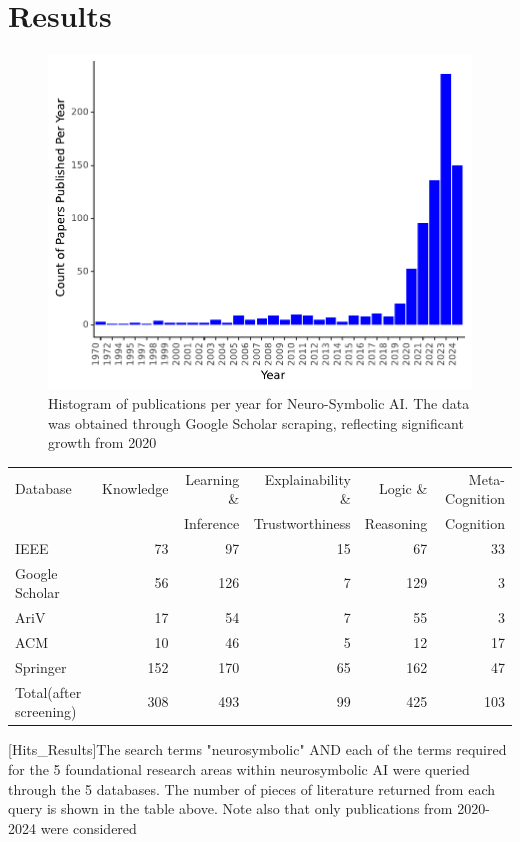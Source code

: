 \documentclass[hf]{ceurart}
\begin{document}
\section{Results}\label{sec:results}
\begin{figure}[ht]
    \centering
   \includegraphics[width=\textwidth]{Figures/publications_by_year_v2.pdf}
    \caption{Histogram of publications per year for Neuro-Symbolic AI. The data was obtained through Google Scholar scraping, reflecting significant growth from 2020}
    \label{fig:pubs_by_year}
\end{figure}


\begin{table}[ht]
    \centering
    \begin{tabular}{lrrrrr}
        Database & Knowledge & Learning \& & Explainability \& & Logic \& & Meta-Cognition \\
         &  & Inference & Trustworthiness & Reasoning & Cognition \\
        \hline
        IEEE & 73 & 97 & 15 & 67 & 33  \\
        Google Scholar & 56 & 126 & 7 & 129 & 3  \\
        Ar\textnormal{\raisebox{0.5ex}{$\chi$}}iV & 17 & 54 & 7 & 55 & 3  \\
        ACM & 10 & 46 & 5 & 12 & 17  \\
        Springer & 152 & 170 & 65 & 162 & 47  \\
        Total(after screening)   & 308 & 493 & 99 & 425 & 103  \\
     \end{tabular}
     [Hits_Results]{The search terms "neurosymbolic" AND each of the terms required for the 5 foundational research areas within neurosymbolic AI were queried through the 5 databases. The number of pieces of literature returned from each query is shown in the table above. Note also that only publications from 2020-2024 were considered}
\label{tab::hits_2_results}
\end{table}
\end{document}
